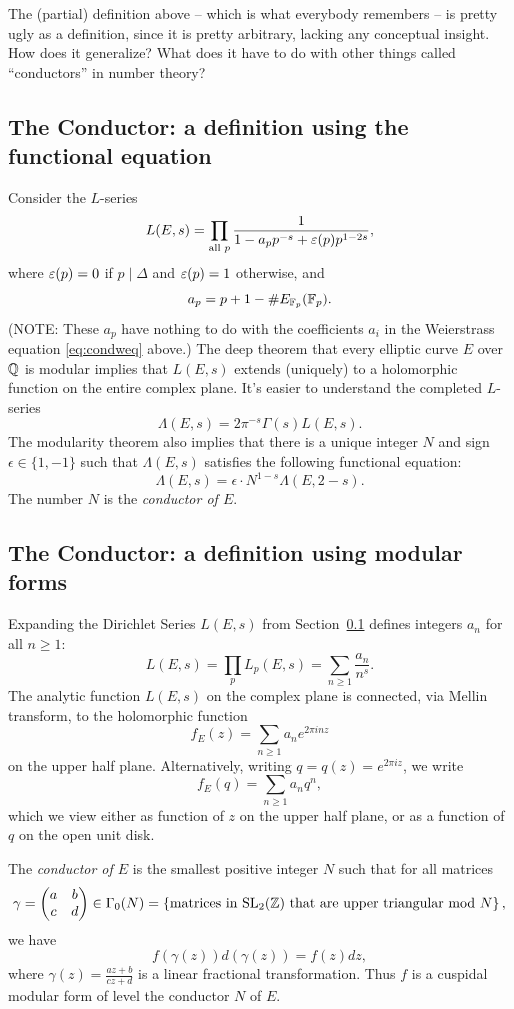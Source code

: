 \documentclass{book}
\begin{document}
The (partial) definition above -- which is what everybody remembers -- is
pretty ugly as a definition, since it is pretty arbitrary, lacking any
conceptual insight.   How does it generalize?  What does it have to do
with other things called ``conductors'' in number theory?

\subsection{The Conductor: a definition using the functional equation}\label{sec:condfe}
Consider the $L$-series
$$
L(E,s) = \prod_{\text{all }p} \frac{1}{1-a_p p^{-s} + \varepsilon(p)p^{1-2s}},
$$
where $\varepsilon(p)=0$ if $p\mid \Delta$ and $\varepsilon(p)=1$ otherwise, and
$$
 a_p = p + 1 - \# E_{\mathbb{F}_p}(\mathbb{F}_p).
$$
(NOTE: These $a_p$ have nothing to do with the coefficients
$a_i$ in the Weierstrass equation \eqref{eq:condweq} above.)
The deep theorem that every elliptic curve $E$ over $\mathbb{Q}$ is modular
implies that $L(E,s)$ extends (uniquely) to a holomorphic function
on the entire complex plane.  It's easier to understand the completed
$L$-series
$$
\Lambda(E,s) = 2\pi^{-s}\Gamma(s) L(E,s).
$$
The modularity theorem also implies that there is a unique integer
$N$ and sign $\epsilon\in \{1,-1\}$ such that $\Lambda(E,s)$ satisfies the following functional equation:
$$
\Lambda(E,s) = \epsilon \cdot N^{1-s} \Lambda(E,2-s).
$$
The number $N$ is the {\em conductor of $E$}.

\subsection{The Conductor: a definition using modular forms}
Expanding the Dirichlet Series $L(E,s)$ from Section~\ref{sec:condfe}
defines integers $a_n$ for all $n\geq 1$:
$$
L(E,s) = \prod_{p} L_p(E,s) = \sum_{n\geq 1} \frac{a_n}{n^s}.
$$
The analytic function $L(E,s)$ on the complex plane is connected,
via Mellin transform, to the holomorphic function
$$
f_E(z) = \sum_{n\geq 1} a_n e^{2\pi i n z}
$$
on the upper half plane.  Alternatively, writing $q=q(z) = e^{2\pi i z}$,
we write
$$
f_E(q) = \sum_{n\geq 1} a_n q^n,
$$
which we view either as function of $z$ on the upper half plane,
or as a function of $q$ on the open unit disk.

The {\em conductor of $E$} is the smallest positive integer $N$
such that for all  matrices
$$
\gamma = \left( \begin{matrix}a&b\\c&d \end{matrix}\right) \in \Gamma_0(N)
  = \left\{\text{matrices in $\operatorname{SL}_2(\mathbb{Z})$ that are upper triangular mod $N$}\right\},
$$
we have
$$f(\gamma(z))d(\gamma(z)) = f(z)dz,$$
where $\gamma(z) = \frac{az+b}{cz+d}$ is a linear fractional transformation.
Thus $f$ is a cuspidal modular form of level the conductor
$N$ of $E$.
\end{document}
